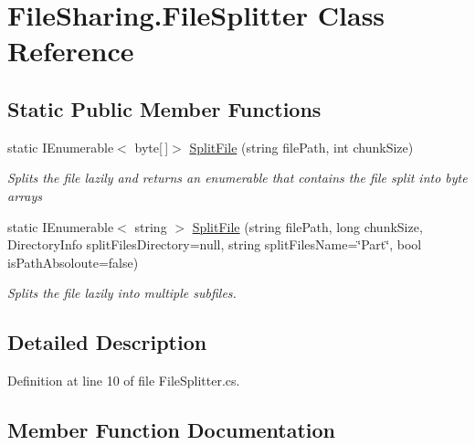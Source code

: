 \hypertarget{class_file_sharing_1_1_file_splitter}{}\section{File\+Sharing.\+File\+Splitter Class Reference}
\label{class_file_sharing_1_1_file_splitter}
\subsection*{Static Public Member Functions}
\begin{DoxyCompactItemize}
\item 
static I\+Enumerable$<$ byte\mbox{[}$\,$\mbox{]}$>$ \hyperlink{class_file_sharing_1_1_file_splitter_a25696a2fad3740fa24f79fd194da6ec3}{Split\+File} (string file\+Path, int chunk\+Size)
\begin{DoxyCompactList}\small\item\em Splits the file lazily and returns an enumerable that contains the file split into byte arrays \end{DoxyCompactList}\item 
static I\+Enumerable$<$ string $>$ \hyperlink{class_file_sharing_1_1_file_splitter_aa0f7dc920db0a5bd0f7ae992298d1198}{Split\+File} (string file\+Path, long chunk\+Size, Directory\+Info split\+Files\+Directory=null, string split\+Files\+Name=\char`\"{}Part\char`\"{}, bool is\+Path\+Absoloute=false)
\begin{DoxyCompactList}\small\item\em Splits the file lazily into multiple subfiles. \end{DoxyCompactList}\end{DoxyCompactItemize}


\subsection{Detailed Description}


Definition at line 10 of file File\+Splitter.\+cs.



\subsection{Member Function Documentation}
\mbox{\label{class_file_sharing_1_1_file_splitter_a25696a2fad3740fa24f79fd194da6ec3}} 
